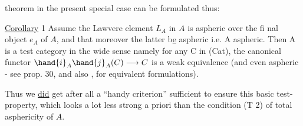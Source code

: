 
theorem in the present special case can be formulated thus:

\uline{Corollary} 1  Assume the Lawvere element $L_A$ in $A\hat{}$ is aspheric over the fi%
nal object $e_{A\hat{}}$ of $A\hat{}$,  and that moreover the latter b\uline{e} aspheric i.e. A
aspheric.  Then A is a test category in the wide sense\hand{,} namely for any
C in (Cat),  the canonical functor  $\hand{i}_A\hand{j}_A(C)\longrightarrow C$  is a weak equivalence
(and even aspheric -  see prop.   30, \hand{(}and also
, for equivalent formulations\deleted{)}).

Thus we \uline{did} get after all a ``handy criterion'' sufficient to ensure
this basic test-property,  which looks a lot less strong  a priori
than the condition (T 2) \inserted{[plus T1, T3]} of total asphericity of $A\hat{}$.

